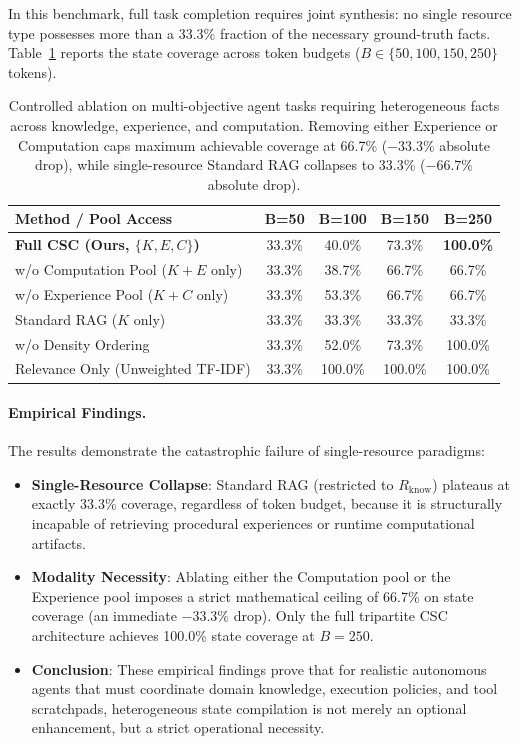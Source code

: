 \documentclass{article}
\begin{document}
In this benchmark, full task completion requires joint synthesis: no single resource type possesses more than a 33.3\% fraction of the necessary ground-truth facts. Table~\ref{tab:cross_resource_necessity_appendix} reports the state coverage across token budgets ($B \in \{50, 100, 150, 250\}$ tokens).

\begin{table}[h]
\centering
\small
\begin{tabular}{lcccc}
\toprule
\textbf{Method / Pool Access} & \textbf{B=50} & \textbf{B=100} & \textbf{B=150} & \textbf{B=250} \\
\midrule
\textbf{Full CSC (Ours, $\{K, E, C\}$)} & 33.3\% & 40.0\% & 73.3\% & \textbf{100.0\%} \\
w/o Computation Pool ($K+E$ only) & 33.3\% & 38.7\% & 66.7\% & 66.7\% \\
w/o Experience Pool ($K+C$ only) & 33.3\% & 53.3\% & 66.7\% & 66.7\% \\
Standard RAG ($K$ only) & 33.3\% & 33.3\% & 33.3\% & 33.3\% \\
w/o Density Ordering & 33.3\% & 52.0\% & 73.3\% & 100.0\% \\
Relevance Only (Unweighted TF-IDF) & 33.3\% & 100.0\% & 100.0\% & 100.0\% \\
\bottomrule
\end{tabular}
\caption{Controlled ablation on multi-objective agent tasks requiring heterogeneous facts across knowledge, experience, and computation. Removing either Experience or Computation caps maximum achievable coverage at 66.7\% ($-33.3\%$ absolute drop), while single-resource Standard RAG collapses to 33.3\% ($-66.7\%$ absolute drop).}
\label{tab:cross_resource_necessity_appendix}
\end{table}

\paragraph{Empirical Findings.} The results demonstrate the catastrophic failure of single-resource paradigms:
\begin{itemize}
    \item \textbf{Single-Resource Collapse}: Standard RAG (restricted to $R_{\text{know}}$) plateaus at exactly 33.3\% coverage, regardless of token budget, because it is structurally incapable of retrieving procedural experiences or runtime computational artifacts.
    \item \textbf{Modality Necessity}: Ablating either the Computation pool or the Experience pool imposes a strict mathematical ceiling of 66.7\% on state coverage (an immediate $-33.3\%$ drop). Only the full tripartite CSC architecture achieves 100.0\% state coverage at $B=250$.
    \item \textbf{Conclusion}: These empirical findings prove that for realistic autonomous agents that must coordinate domain knowledge, execution policies, and tool scratchpads, heterogeneous state compilation is not merely an optional enhancement, but a strict operational necessity.
\end{itemize}
\end{document}
